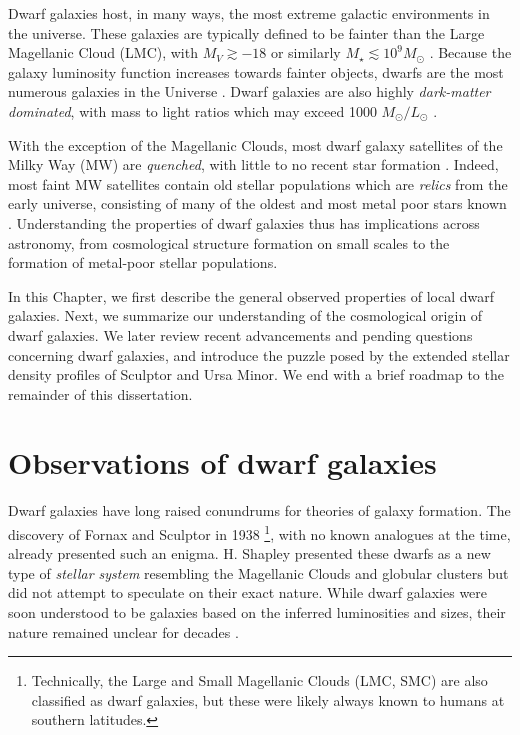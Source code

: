 Dwarf galaxies host, in many ways, the most extreme galactic
environments in the universe. These galaxies are typically defined to be
fainter than the Large Magellanic Cloud (LMC), with \(M_V \gtrsim -18\)
or similarly \(M_\star \lesssim 10^9 M_\odot\)
\citep[e.g.,][]{hodge1971, mcconnachie2012}. Because the galaxy
luminosity function increases towards fainter objects, dwarfs are the
most numerous galaxies in the Universe
\citep[e.g.,][]{blanton+2005, mao+2021}. Dwarf galaxies are also highly
\emph{dark-matter dominated}, with mass to light ratios which may exceed
1000 \(M_\odot/ L_\odot\) \citep[e.g.,][]{simon+geha2007, hayashi+2023}.

With the exception of the Magellanic Clouds, most dwarf galaxy
satellites of the Milky Way (MW) are \emph{quenched}, with little to no
recent star formation \citep[e.g.,][]{weisz+2014}. Indeed, most faint MW
satellites contain old stellar populations which are \emph{relics} from
the early universe, consisting of many of the oldest and most metal poor
stars known \citep{simon2019}. Understanding the properties of dwarf
galaxies thus has implications across astronomy, from cosmological
structure formation on small scales to the formation of metal-poor
stellar populations.

In this Chapter, we first describe the general observed properties of
local dwarf galaxies. Next, we summarize our understanding of the
cosmological origin of dwarf galaxies. We later review recent
advancements and pending questions concerning dwarf galaxies, and
introduce the puzzle posed by the extended stellar density profiles of
Sculptor and Ursa Minor. We end with a brief roadmap to the remainder of
this dissertation.

\section{Observations of dwarf
galaxies}\label{observations-of-dwarf-galaxies}

Dwarf galaxies have long raised conundrums for theories of galaxy
formation. The discovery of Fornax and Sculptor in 1938
\citep{shapley1938}\footnote{Technically, the Large and Small Magellanic
  Clouds (LMC, SMC) are also classified as dwarf galaxies, but these
  were likely always known to humans at southern latitudes.}, with no
known analogues at the time, already presented such an enigma. H.
Shapley presented these dwarfs as a new type of \emph{stellar system}
resembling the Magellanic Clouds and globular clusters but did not
attempt to speculate on their exact nature. While dwarf galaxies were
soon understood to be galaxies based on the inferred luminosities and
sizes, their nature remained unclear for decades
\citep[e.g.,][]{hodge1971, gallagher+wyse1994}.

